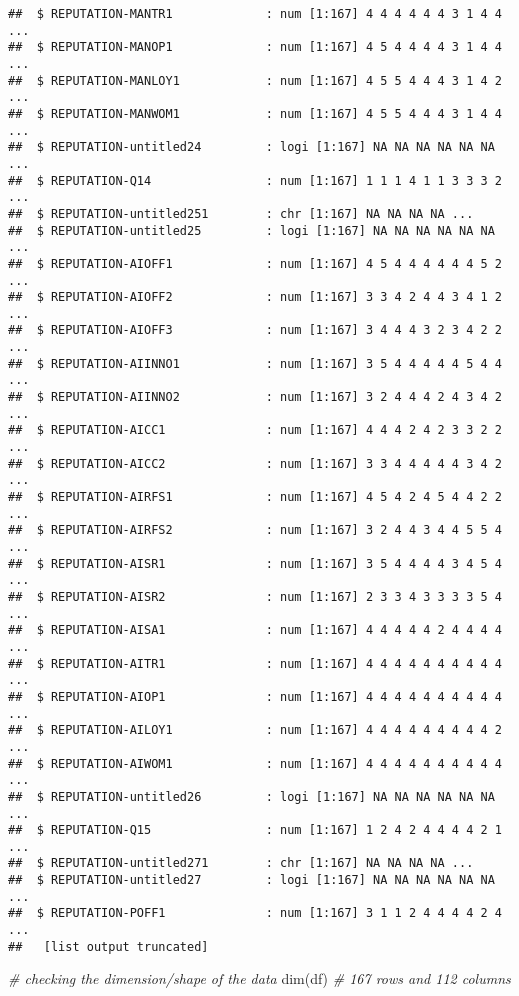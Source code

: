\documentclass[
]{article}
\newenvironment{Shaded}{\begin{snugshade}}{\end{snugshade}}
\newcommand{\CommentTok}[1]{\textcolor[rgb]{0.56,0.35,0.01}{\textit{#1}}}
\newcommand{\FunctionTok}[1]{\textcolor[rgb]{0.00,0.00,0.00}{#1}}
\newcommand{\NormalTok}[1]{#1}
\begin{document}
\begin{verbatim}
##  $ REPUTATION-MANTR1             : num [1:167] 4 4 4 4 4 4 3 1 4 4 ...
##  $ REPUTATION-MANOP1             : num [1:167] 4 5 4 4 4 4 3 1 4 4 ...
##  $ REPUTATION-MANLOY1            : num [1:167] 4 5 5 4 4 4 3 1 4 2 ...
##  $ REPUTATION-MANWOM1            : num [1:167] 4 5 5 4 4 4 3 1 4 4 ...
##  $ REPUTATION-untitled24         : logi [1:167] NA NA NA NA NA NA ...
##  $ REPUTATION-Q14                : num [1:167] 1 1 1 4 1 1 3 3 3 2 ...
##  $ REPUTATION-untitled251        : chr [1:167] NA NA NA NA ...
##  $ REPUTATION-untitled25         : logi [1:167] NA NA NA NA NA NA ...
##  $ REPUTATION-AIOFF1             : num [1:167] 4 5 4 4 4 4 4 4 5 2 ...
##  $ REPUTATION-AIOFF2             : num [1:167] 3 3 4 2 4 4 3 4 1 2 ...
##  $ REPUTATION-AIOFF3             : num [1:167] 3 4 4 4 3 2 3 4 2 2 ...
##  $ REPUTATION-AIINNO1            : num [1:167] 3 5 4 4 4 4 4 5 4 4 ...
##  $ REPUTATION-AIINNO2            : num [1:167] 3 2 4 4 4 2 4 3 4 2 ...
##  $ REPUTATION-AICC1              : num [1:167] 4 4 4 2 4 2 3 3 2 2 ...
##  $ REPUTATION-AICC2              : num [1:167] 3 3 4 4 4 4 4 3 4 2 ...
##  $ REPUTATION-AIRFS1             : num [1:167] 4 5 4 2 4 5 4 4 2 2 ...
##  $ REPUTATION-AIRFS2             : num [1:167] 3 2 4 4 3 4 4 5 5 4 ...
##  $ REPUTATION-AISR1              : num [1:167] 3 5 4 4 4 4 3 4 5 4 ...
##  $ REPUTATION-AISR2              : num [1:167] 2 3 3 4 3 3 3 3 5 4 ...
##  $ REPUTATION-AISA1              : num [1:167] 4 4 4 4 4 2 4 4 4 4 ...
##  $ REPUTATION-AITR1              : num [1:167] 4 4 4 4 4 4 4 4 4 4 ...
##  $ REPUTATION-AIOP1              : num [1:167] 4 4 4 4 4 4 4 4 4 4 ...
##  $ REPUTATION-AILOY1             : num [1:167] 4 4 4 4 4 4 4 4 4 2 ...
##  $ REPUTATION-AIWOM1             : num [1:167] 4 4 4 4 4 4 4 4 4 4 ...
##  $ REPUTATION-untitled26         : logi [1:167] NA NA NA NA NA NA ...
##  $ REPUTATION-Q15                : num [1:167] 1 2 4 2 4 4 4 4 2 1 ...
##  $ REPUTATION-untitled271        : chr [1:167] NA NA NA NA ...
##  $ REPUTATION-untitled27         : logi [1:167] NA NA NA NA NA NA ...
##  $ REPUTATION-POFF1              : num [1:167] 3 1 1 2 4 4 4 4 2 4 ...
##   [list output truncated]
\end{verbatim}

\begin{Shaded}
\begin{Highlighting}[]
\CommentTok{\# checking the dimension/shape of the data}
\FunctionTok{dim}\NormalTok{(df) }\CommentTok{\# 167 rows and 112 columns}
\end{Highlighting}
\end{Shaded}
\end{document}
